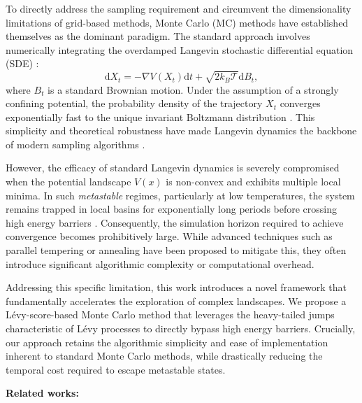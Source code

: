 To directly address the sampling requirement and circumvent the dimensionality limitations of grid-based methods, Monte Carlo (MC) methods have established themselves as the dominant paradigm. The standard approach involves numerically integrating the overdamped Langevin stochastic differential equation (SDE) \cite{darve2009computing, ermak_numerical_1980, gilsing2007sdelab}:
\begin{equation}\label{eqn:sdeintro}
    \mathrm{d} X_t = -\nabla V(X_t)\mathrm{d} t + \sqrt{2k_B\mathcal{T}}\mathrm{d} B_t,
\end{equation}
where $B_t$ is a standard Brownian motion. Under the assumption of a strongly confining potential, the probability density of the trajectory $X_t$ converges exponentially fast to the unique invariant Boltzmann distribution \cite{pavliotis_stochastic_2014}. This simplicity and theoretical robustness have made Langevin dynamics the backbone of modern sampling algorithms \cite{cheng_underdamped_2018, dalalyan_sampling_2020, leimkuhler2013rational}.



However, the efficacy of standard Langevin dynamics is severely compromised when the potential landscape $V(x)$ is non-convex and exhibits multiple local minima. In such \emph{metastable} regimes, particularly at low temperatures, the system remains trapped in local basins for exponentially long periods before crossing high energy barriers \cite{freidlin2012random, pavliotis_stochastic_2014}. Consequently, the simulation horizon required to achieve convergence becomes prohibitively large. While advanced techniques such as parallel tempering \cite{lu_methodological_2019} or annealing \cite{neal_annealed_2001} have been proposed to mitigate this, they often introduce significant algorithmic complexity or computational overhead.

Addressing this specific limitation, this work introduces a novel framework that fundamentally accelerates the exploration of complex landscapes. We propose a L\'{e}vy-score-based Monte Carlo method that leverages the heavy-tailed jumps characteristic of L\'{e}vy processes to directly bypass high energy barriers. Crucially, our approach retains the algorithmic simplicity and ease of implementation inherent to standard Monte Carlo methods, while drastically reducing the temporal cost required to escape metastable states.

\smallskip
{\bf Related works:}

